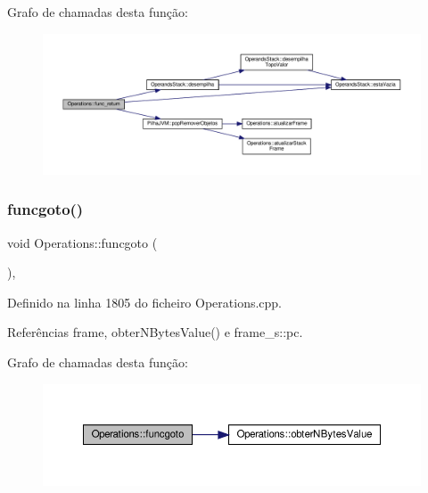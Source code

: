 Grafo de chamadas desta função\+:\nopagebreak
\begin{figure}[H]
\begin{center}
\leavevmode
\includegraphics[width=350pt]{classOperations_aa33b77fb62f7e76c347503c97c6b080b_cgraph}
\end{center}
\end{figure}
\mbox{\label{classOperations_a63d1d75decab8e709a6c5da5e59d8188}} 
\subsubsection{\texorpdfstring{funcgoto()}{funcgoto()}}
{\footnotesize\ttfamily void Operations\+::funcgoto (\begin{DoxyParamCaption}{ }\end{DoxyParamCaption})\hspace{0.3cm}{\ttfamily [static]}, {\ttfamily [private]}}



Definido na linha 1805 do ficheiro Operations.\+cpp.



Referências frame, obter\+N\+Bytes\+Value() e frame\+\_\+s\+::pc.

Grafo de chamadas desta função\+:\nopagebreak
\begin{figure}[H]
\begin{center}
\leavevmode
\includegraphics[width=350pt]{classOperations_a63d1d75decab8e709a6c5da5e59d8188_cgraph}
\end{center}
\end{figure}
\mbox{\label{classOperations_a1880a30623072f8388be782dcf1a390e}} 
